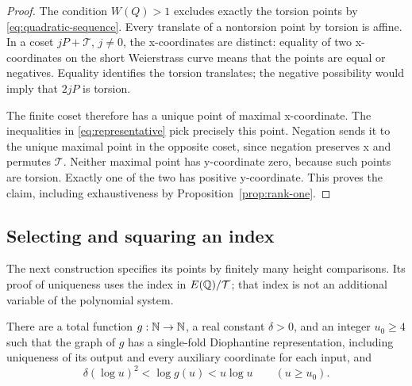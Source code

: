 \begin{proof}
The condition \(W(Q)>1\) excludes exactly the torsion points by
\eqref{eq:quadratic-sequence}.  Every translate of a nontorsion
point by torsion is affine.  In a coset \(jP+\mathcal T\),
\(j\ne0\), the x-coordinates are distinct: equality of two
x-coordinates on the short Weierstrass curve means that the points
are equal or negatives.  Equality identifies the torsion translates;
the negative possibility would imply that \(2jP\) is torsion.

The finite coset therefore has a unique point of maximal x-coordinate.
The inequalities in \eqref{eq:representative} pick precisely this
point.  Negation sends it to the unique maximal point in the opposite
coset, since negation preserves x and permutes \(\mathcal T\).
Neither maximal point has y-coordinate zero, because such points
are torsion.  Exactly one of the two has positive y-coordinate.
This proves the claim, including exhaustiveness by
Proposition~\ref{prop:rank-one}.
\end{proof}

\subsection{Selecting and squaring an index}

The next construction specifies its points by finitely many height
comparisons.  Its proof of uniqueness uses the index in
\(E(\mathbb Q)/\mathcal T\); that index is not an additional
variable of the polynomial system.

\begin{proposition}\label{prop:growth}
There are a total function \(g:\mathbb N\to\mathbb N\), a real constant
\(\delta>0\), and an integer \(u_0\ge4\) such that the graph
of \(g\) has a single-fold Diophantine representation, including
uniqueness of its output and every auxiliary coordinate for each
input, and
\begin{equation}\label{eq:growth-bounds}
 \delta(\log u)^2<\log g(u)<u\log u
       \qquad(u\ge u_0).
\end{equation}
\end{proposition}

